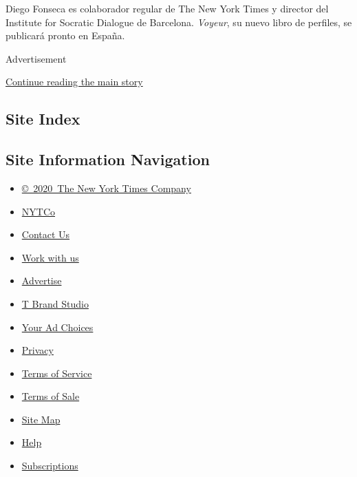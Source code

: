 Diego Fonseca es colaborador regular de The New York Times y director
del Institute for Socratic Dialogue de Barcelona. \emph{Voyeur}, su
nuevo libro de perfiles, se publicará pronto en España.

Advertisement

\protect\hyperlink{after-bottom}{Continue reading the main story}

\hypertarget{site-index}{%
\subsection{Site Index}\label{site-index}}

\hypertarget{site-information-navigation}{%
\subsection{Site Information
Navigation}\label{site-information-navigation}}

\begin{itemize}
\tightlist
\item
  \href{https://help.nytimes3xbfgragh.onion/hc/en-us/articles/115014792127-Copyright-notice}{©~2020~The
  New York Times Company}
\end{itemize}

\begin{itemize}
\tightlist
\item
  \href{https://www.nytco.com/}{NYTCo}
\item
  \href{https://help.nytimes3xbfgragh.onion/hc/en-us/articles/115015385887-Contact-Us}{Contact
  Us}
\item
  \href{https://www.nytco.com/careers/}{Work with us}
\item
  \href{https://nytmediakit.com/}{Advertise}
\item
  \href{http://www.tbrandstudio.com/}{T Brand Studio}
\item
  \href{https://www.nytimes3xbfgragh.onion/privacy/cookie-policy\#how-do-i-manage-trackers}{Your
  Ad Choices}
\item
  \href{https://www.nytimes3xbfgragh.onion/privacy}{Privacy}
\item
  \href{https://help.nytimes3xbfgragh.onion/hc/en-us/articles/115014893428-Terms-of-service}{Terms
  of Service}
\item
  \href{https://help.nytimes3xbfgragh.onion/hc/en-us/articles/115014893968-Terms-of-sale}{Terms
  of Sale}
\item
  \href{https://spiderbites.nytimes3xbfgragh.onion}{Site Map}
\item
  \href{https://help.nytimes3xbfgragh.onion/hc/en-us}{Help}
\item
  \href{https://www.nytimes3xbfgragh.onion/subscription?campaignId=37WXW}{Subscriptions}
\end{itemize}
